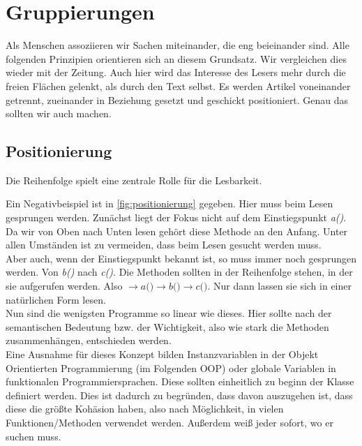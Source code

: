 \section{Gruppierungen}
    Als Menschen assoziieren wir Sachen miteinander, die eng beieinander sind.
    Alle folgenden Prinzipien orientieren sich an diesem Grundsatz.
    Wir vergleichen dies wieder mit der Zeitung.
    Auch hier wird das Interesse des Lesers mehr durch die freien Flächen gelenkt, als durch den Text selbst.
    Es werden Artikel voneinander getrennt, zueinander in Beziehung gesetzt und geschickt positioniert.
    Genau das sollten wir auch machen.

    \subsection{Positionierung}
        Die Reihenfolge spielt eine zentrale Rolle für die Lesbarkeit.
        
        Ein Negativbeispiel ist in \ref{fig:positionierung} gegeben.
        Hier muss beim Lesen gesprungen werden.
        Zunächst liegt der Fokus nicht auf dem Einstiegspunkt \textit{a()}.
        Da wir von Oben nach Unten lesen gehört diese Methode an den Anfang.
        Unter allen Umständen ist zu vermeiden, dass beim Lesen gesucht werden muss.\\
        Aber auch, wenn der Einstiegspunkt bekannt ist, so muss immer noch gesprungen werden.
        Von \textit{b()} nach \textit{c()}.
        Die Methoden sollten in der Reihenfolge stehen, in der sie aufgerufen werden.
        Also $\rightarrow\textit{a()}\rightarrow\textit{b()}\rightarrow\textit{c()}$.
        Nur dann lassen sie sich in einer natürlichen Form lesen.\\
        Nun sind die wenigsten Programme so linear wie dieses.
        Hier sollte nach der semantischen Bedeutung bzw. der Wichtigkeit, also wie stark die Methoden zusammenhängen, entschieden werden.\\
        Eine Ausnahme für dieses Konzept bilden Instanzvariablen in der Objekt Orientierten Programmierung (im Folgenden OOP) oder globale Variablen in funktionalen Programmiersprachen.
        Diese sollten einheitlich zu beginn der Klasse definiert werden.
        Dies ist dadurch zu begründen, dass davon auszugehen ist, dass diese die größte Kohäsion haben, also nach Möglichkeit, in vielen Funktionen/Methoden verwendet werden.
        Außerdem weiß jeder sofort, wo er suchen muss.\\
